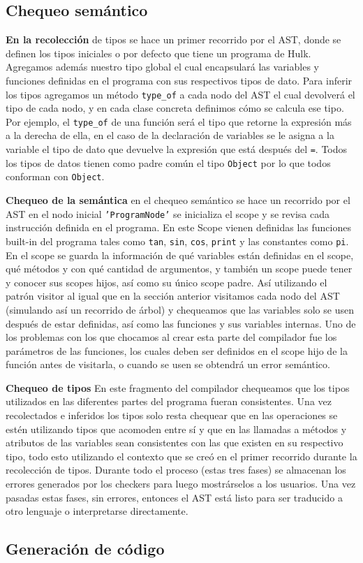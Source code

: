 \documentclass[12pt]{article}
\begin{document}
\subsection{Chequeo semántico}

\textbf{En la recolección} de tipos se hace un primer recorrido por el AST, donde se definen los tipos iniciales o por defecto que tiene un programa de Hulk. Agregamos además nuestro tipo global el cual encapsulará las variables y funciones definidas en el programa con sus respectivos tipos de dato. Para inferir los tipos agregamos un método \texttt{type\_of} a cada nodo del AST el cual devolverá el tipo de cada nodo, y en cada clase concreta definimos cómo se calcula ese tipo. Por ejemplo, el \texttt{type\_of} de una función será el tipo que retorne la expresión más a la derecha de ella, en el caso de la declaración de variables se le asigna a la variable el tipo de dato que devuelve la expresión que está después del \texttt{=}. Todos los tipos de datos tienen como padre común el tipo \texttt{Object} por lo que todos conforman con \texttt{Object}.

\textbf{Chequeo de la semántica} en el chequeo semántico se hace un recorrido por el AST en el nodo inicial \texttt{'ProgramNode'} se inicializa el scope y se revisa cada instrucción definida en el programa. En este Scope vienen definidas las funciones built-in del programa tales como \texttt{tan}, \texttt{sin}, \texttt{cos}, \texttt{print} y las constantes como \texttt{pi}. En el scope se guarda la información de qué variables están definidas en el scope, qué métodos y con qué cantidad de argumentos, y también un scope puede tener y conocer sus scopes hijos, así como su único scope padre. Así utilizando el patrón visitor al igual que en la sección anterior visitamos cada nodo del AST (simulando así un recorrido de árbol) y chequeamos que las variables solo se usen después de estar definidas, así como las funciones y sus variables internas. Uno de los problemas con los que chocamos al crear esta parte del compilador fue los parámetros de las funciones, los cuales deben ser definidos en el scope hijo de la función antes de visitarla, o cuando se usen se obtendrá un error semántico.

\textbf{Chequeo de tipos} En este fragmento del compilador chequeamos que los tipos utilizados en las diferentes partes del programa fueran consistentes. Una vez recolectados e inferidos los tipos solo resta chequear que en las operaciones se estén utilizando tipos que acomoden entre sí y que en las llamadas a métodos y atributos de las variables sean consistentes con las que existen en su respectivo tipo, todo esto utilizando el contexto que se creó en el primer recorrido durante la recolección de tipos. Durante todo el proceso (estas tres fases) se almacenan los errores generados por los checkers para luego mostrárselos a los usuarios. Una vez pasadas estas fases, sin errores, entonces el AST está listo para ser traducido a otro lenguaje o interpretarse directamente.


\subsection{Generación de código}
\end{document}
